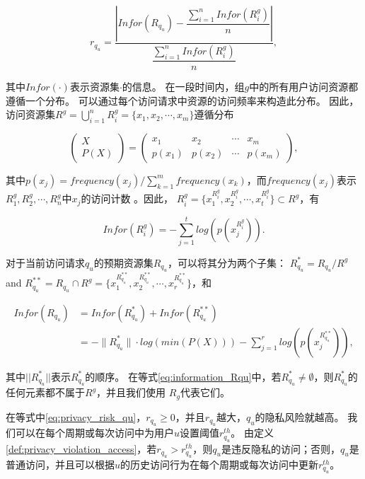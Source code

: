 \begin{equation}\label{eq:privacy_risk_qu}
r_{q_u} = \dfrac{|Infor(R_{q_u})-\dfrac{\sum ^{n}_{i=1} Infor(R^g_i)}{n}|}{\dfrac{\sum ^{n}_{i=1} Infor(R^g_i)}{n}}, 
\end{equation}

其中$Infor(\cdot)$表示资源集$\cdot$的信息。 在一段时间内，组$g$中的所有用户访问资源都遵循一个分布。 可以通过每个访问请求中资源的访问频率来构造此分布。 因此，访问资源集$R^g = \bigcup _{i=1}^n R^g_i=\{x_1, x_2, \cdots, x_m\}$遵循分布

\begin{equation}\label{eq:distribution_Rg}
\left(
\begin{array}{c}
X \\ P(X)
\end{array}
\right)
=\left(
\begin{array}{cccccccccc}
x_1 &  x_2 & \cdots & x_m
\\ p(x_1) &  p(x_2) & \cdots & p(x_m)
\end{array}
\right),
\end{equation}

其中$p(x_j)=frequency(x_j)/\sum_{k=1}^m frequency(x_k)$，而$frequency(x_j)$表示$R^g_1, R^g_2, \cdots, R^g_n$中$x_j$的访问计数 。因此， $R^g_i =\{x_1^{R^g_i},x_2^{R^g_i},\cdots, x_t^{R^g_i}\} \subset R^g$，有

\begin{equation}\label{eq:information_Rgi}
Infor(R^g_i)=-\sum_{j=1}^t log(p(x_j^{R^g_i})).
\end{equation}


对于当前访问请求$q_u$的预期资源集$R_{q_u}$，可以将其分为两个子集： $R_{q_u}^* = R_{q_u}/R^g$ and $R_{q_u}^{**} = R_{q_u} \cap R^g = \{x_1^{R_{q_u}^{**}},x_2^{R_{q_u}^{**}},\cdots, x_r^{R_{q_u}^{**}}\}$，和

\begin{equation}\label{eq:information_Rqu}
\begin{split}
Infor(R_{q_u})&=Infor(R_{q_u}^{*})  +Infor(R_{q_u}^{**})
\\&=-\|R_{q_u}^*\|\cdot log(min(P(X)))-\sum_{j=1}^r log(p(x_j^{R_{q_u}^{**}})),
\end{split}
\end{equation}

其中$||R_{q_u}^*||$表示$R_{q_u}^*$的顺序。 在等式\ref{eq:information_Rqu}中，若$R_{q_u}^* \neq \emptyset$，则$R_{q_u}^*$的任何元素都不属于$R^g$，并且我们使用 $R_g$代表它们。

在等式中\ref{eq:privacy_risk_qu}，$r_{q_u} \geq 0$，并且$r_{q_u}$越大，$q_u$的隐私风险就越高。 我们可以在每个周期或每次访问中为用户$u$设置阈值$r_{q_u}^{th}$。 由定义\ref{def:privacy_violation_access}，若$r_{q_u} > r_{q_u}^{th}$，则$q_u$是违反隐私的访问；否则，$q_u$是普通访问，并且可以根据$u$的历史访问行为在每个周期或每次访问中更新$r_{q_u}^{th}$。

